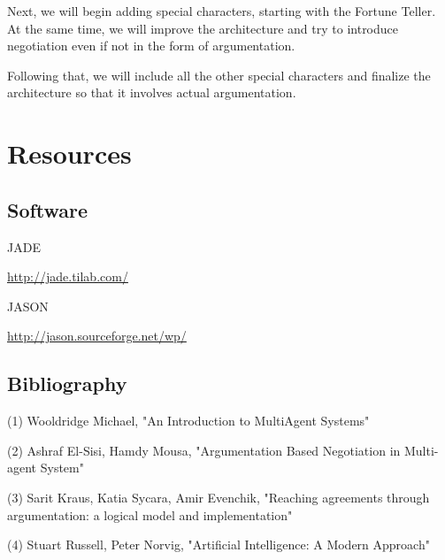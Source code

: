 \documentclass{article}
\begin{document}
Next, we will begin adding special characters, starting with the Fortune Teller. At the same time, we will improve the architecture and try to introduce negotiation even if not in the form of argumentation.

Following that, we will include all the other special characters and finalize the architecture so that it involves actual argumentation.

\section{Resources}

\subsection{Software}
JADE \par
\url{http://jade.tilab.com/} \par 
\vspace{3mm}
JASON \par
\url{http://jason.sourceforge.net/wp/} \par 

\subsection{Bibliography}
\noindent
(1) Wooldridge Michael, "An Introduction to MultiAgent Systems"

\noindent
(2) Ashraf El-Sisi, Hamdy Mousa, "Argumentation Based Negotiation in Multi-agent System"

\noindent
(3) Sarit Kraus, Katia Sycara, Amir Evenchik, "Reaching agreements through argumentation: a logical model and implementation"

\noindent
(4) Stuart Russell, Peter Norvig, "Artificial Intelligence: A Modern Approach"
\end{document}
